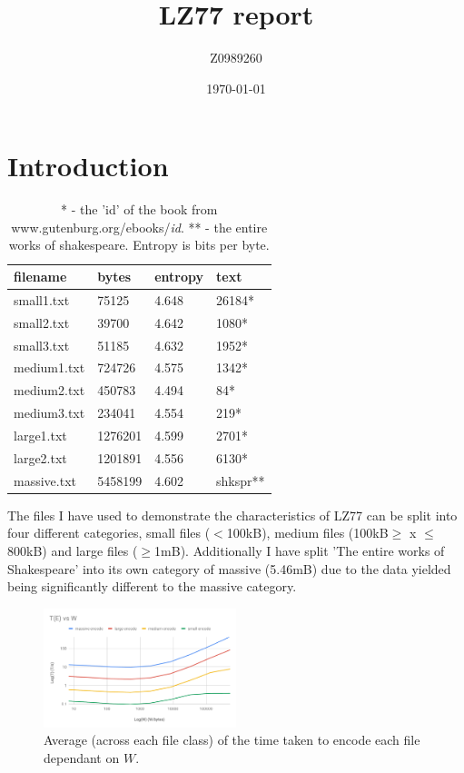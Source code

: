 \documentclass[a4paper, 10pt]{article}
\begin{document}
\title{LZ77 report}
\author{Z0989260}
\date{\today}
\maketitle


\newpage


\section{Introduction}

\begin{table}
\begin{tabularx}{9.2cm}{|X|X|X|X|}
  \hline
  filename & bytes & entropy & text\\ \hline
  
  small1.txt & 75125 & 4.648 & 26184* \\ \hline
  small2.txt & 39700 & 4.642 & 1080* \\ \hline
  small3.txt & 51185 & 4.632 & 1952* \\ \hline

  medium1.txt & 724726 & 4.575 & 1342* \\ \hline
  medium2.txt & 450783 & 4.494 & 84* \\ \hline
  medium3.txt & 234041 & 4.554 & 219* \\ \hline

  large1.txt & 1276201 & 4.599 & 2701* \\ \hline
  large2.txt & 1201891 & 4.556 & 6130* \\ \hline
  massive.txt & 5458199 & 4.602 & shkspr** \\ \hline

\end{tabularx}
\caption*{* - the 'id' of the book from www.gutenburg.org/ebooks/\textit{id}. ** - the entire works of shakespeare. Entropy is bits per byte.}
\end{table}

The files I have used to demonstrate the characteristics of LZ77 can be split into four different categories, small files ($<$100kB), medium files (100kB$\geq$ x $\leq$ 800kB) and large files ($\geq$1mB). Additionally I have split 'The entire works of Shakespeare' into its own category of massive (5.46mB) due to the data yielded being significantly different to the massive category.

\begin{figure}
  \centering
  \includegraphics[width=0.5\textwidth]{TEvsW.pdf}
  \caption{Average (across each file class) of the time taken to encode each file dependant on $W$.}
\end{figure}
\end{document}
